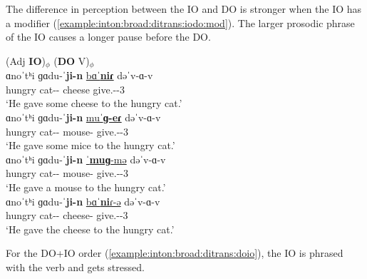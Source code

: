 The difference in perception between the IO and DO is stronger when the IO has a modifier (\ref{example:inton:broad:ditrans:iodo:mod}). The larger prosodic phrase of the IO causes a longer pause before the DO. 


\begin{exe}
	\ex \label{example:inton:broad:ditrans:iodo:mod} \begin{xlist}
		\ex \glll (Adj \textbf{IO})$_\phi$ (\textbf{DO} V)$_\phi$ \\
		ɑnoˈtʰi ɡɑdu-ˈ\textbf{ji-n} \underline{bɑˈ\textbf{niɾ}}  dəˈv-ɑ-v \\
		hungry cat-{\dat}-{} cheese give.{\aorperf}-{\pst}-3{\sg}  \\
		\trans `He gave some cheese to the hungry cat.'
		\\ 
		\ex \gll ɑnoˈtʰi ɡɑdu-ˈ\textbf{ji-n} \underline{muˈ\textbf{ɡ-eɾ}}  dəˈv-ɑ-v \\
		hungry cat-{\dat}-{} mouse-{\pl} give.{\aorperf}-{\pst}-3{\sg}  \\
		\trans `He gave some mice to the hungry cat.'
		\\ 
		\ex \gll ɑnoˈtʰi ɡɑdu-ˈ\textbf{ji-n} \underline{ˈ\textbf{muɡ}-mə}  dəˈv-ɑ-v \\
		hungry cat-{\dat}-{} mouse-{\indf} give.{\aorperf}-{\pst}-3{\sg}  \\
		\trans `He gave a mouse to the hungry cat.'
		\\ 
		\ex \gll ɑnoˈtʰi ɡɑdu-ˈ\textbf{ji-n} \underline{bɑˈ\textbf{ni}ɾ-ə}  dəˈv-ɑ-v \\
		hungry cat-{\dat}-{} cheese-{} give.{\aorperf}-{\pst}-3{\sg}  \\
		\trans `He gave the cheese to the hungry cat.'
		\\ 
	\end{xlist}
\end{exe} 

For the DO+IO order (\ref{example:inton:broad:ditrans:doio}), the IO is phrased with the verb and gets stressed.  


